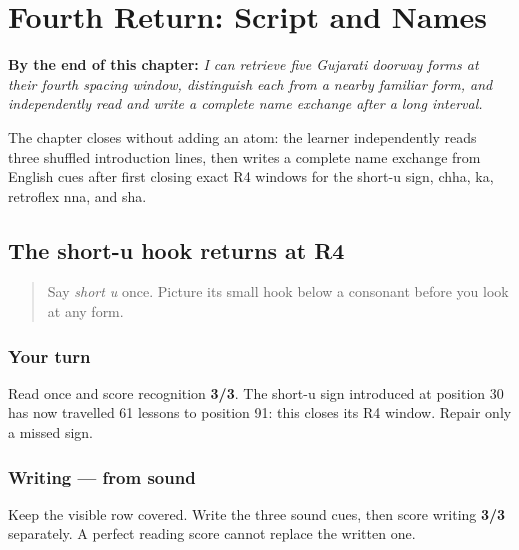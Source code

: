 
\chapter{Fourth Return: Script and Names}
\label{ch:gu-r4-script-names}

\begin{chapteropening}
\textbf{By the end of this chapter:} \emph{I can retrieve five Gujarati doorway forms at their fourth spacing window, distinguish each from a nearby familiar form, and independently read and write a complete name exchange after a long interval.}

The chapter closes without adding an atom: the learner independently reads three shuffled introduction lines, then writes a complete name exchange from English cues after first closing exact R4 windows for the short-u sign, chha, ka, retroflex nna, and sha.
\end{chapteropening}

\section[short-u sign — long-ii sign]{The short-u hook returns at R4}

\label{lesson:GU-R15-u-matra-r4}



\begin{quote}
Say \emph{short u} once. Picture its small hook below a consonant before you look at any form.
\end{quote}

\subsection*{Your turn}
Read \textbf{  } once and score recognition \textbf{3/3}. The short-u sign introduced at position 30 has now travelled 61 lessons to position 91: this closes its R4 window. Repair only a missed sign.

\subsection*{Writing — from sound}
Keep the visible row covered. Write the three sound cues, then score writing \textbf{3/3} separately. A perfect reading score cannot replace the written one.

